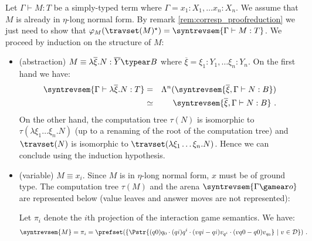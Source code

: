 \proof
Let $\Gamma \vdash M : T$ be a simply-typed term where $\Gamma =
x_1:X_1,\ldots x_n:X_n$. We assume that $M$ is already in
$\eta$-long normal form. By remark \ref{rem:corresp_proofreduction} we just need to
show that $\varphi_M(\travset(M)^\star) = \syntrevsem{\Gamma \vdash M : T}$.
We proceed by induction on the structure of $M$:
\begin{itemize}[$\bullet$]
    \item (abstraction) $M \equiv \lambda \overline{\xi}. N : \overline{Y} \typear B$ where $\overline{\xi} = \xi_1:Y_1,\ldots \xi_n:Y_n$. On the first hand we have:
\begin{eqnarray*}
\syntrevsem{\Gamma \vdash \lambda \overline{\xi}. N:T} &=& \Lambda^n( \syntrevsem{\overline{\xi}, \Gamma \vdash N: B } ) \\
        &\simeq& \syntrevsem{\overline{\xi}, \Gamma \vdash N: B } \ .
\end{eqnarray*}
On the other hand, the computation tree $\tau(N)$ is isomorphic to
$\tau(\lambda \xi_1\ldots \xi_n . N)$ (up to a renaming of the root
of the computation tree) and $\travset(N)$ is isomorphic to
$\travset(\lambda \xi_1\ldots \xi_n . N)$.
Hence we can conclude using the induction hypothesis.

  \item (variable) $M \equiv x_i$. Since $M$ is in $\eta$-long normal form, $x$ must be of ground
      type. The computation tree $\tau(M)$ and the arena $\syntrevsem{\Gamma \gamear o}$ are represented below
      (value leaves and answer moves are not represented):
\begin{center}
\end{center}
        Let $\pi_i$ denote the $i$th projection of the interaction game
        semantics. We have:
        \begin{align*}
        \syntrevsem{M} &= \pi_i = \prefset(\{ \Pstr{(q0){q_0} \cdot (qi){q^i} \cdot (vqi-qi){v_{q^i}} \cdot (vq0-q0){v_{q_0}} } \ | \ v\in \mathcal{D} \})\ .
        \end{align*}


\end{itemize}
